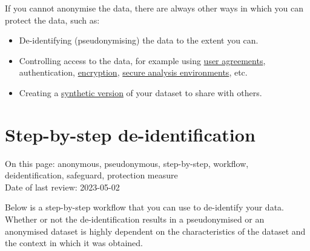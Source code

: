 \documentclass[
]{book}
\providecommand{\tightlist}{%
  \setlength{\itemsep}{0pt}\setlength{\parskip}{0pt}}
\begin{document}
If you cannot anonymise the data, there are always other ways in which you can
protect the data, such as:

\begin{itemize}
\tightlist
\item
  De-identifying (pseudonymising) the data to the extent you can.
\item
  Controlling access to the data, for example using
  \protect\hyperlink{agreements}{user agreements}, authentication, \protect\hyperlink{encryption}{encryption},
  \protect\hyperlink{secure-computation}{secure analysis environments}, etc.
\item
  Creating a \protect\hyperlink{synthetic-data}{synthetic version} of your dataset to share with
  others.
\end{itemize}

\hypertarget{deidentification-workflow}{%
\section{Step-by-step de-identification}\label{deidentification-workflow}}

On this page: anonymous, pseudonymous, step-by-step, workflow, deidentification,
safeguard, protection measure\\
Date of last review: 2023-05-02

Below is a step-by-step workflow that you can use to de-identify your data.
Whether or not the de-identification results in a pseudonymised or an anonymised
dataset is highly dependent on the characteristics of the dataset and the context
in which it was obtained.
\end{document}
